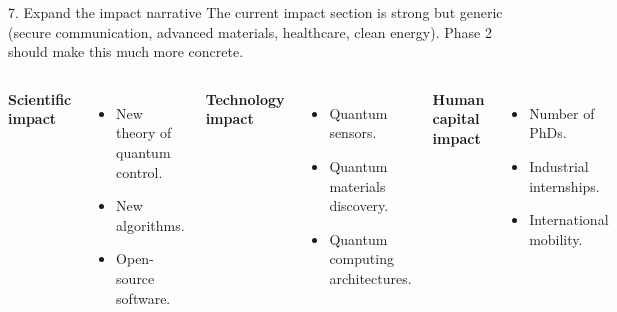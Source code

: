 \documentclass[10pt,aspectratio=169]{beamer}
\begin{document}
\begin{frame}{7. Expand the impact narrative}
  The current impact section is strong but generic (secure communication, advanced materials,
  healthcare, clean energy). Phase 2 should make this much more concrete.
  \vfill
  \begin{columns}[T]
    \textbf{Scientific impact}
    \begin{itemize}\small
      \item New theory of quantum control.
      \item New algorithms.
      \item Open-source software.
    \end{itemize}

    \textbf{Technology impact}
    \begin{itemize}\small
      \item Quantum sensors.
      \item Quantum materials discovery.
      \item Quantum computing architectures.
    \end{itemize}

    \textbf{Human capital impact}
    \begin{itemize}\small
      \item Number of PhDs.
      \item Industrial internships.
      \item International mobility.
    \end{itemize}
  \end{columns}
\end{frame}
\end{document}
